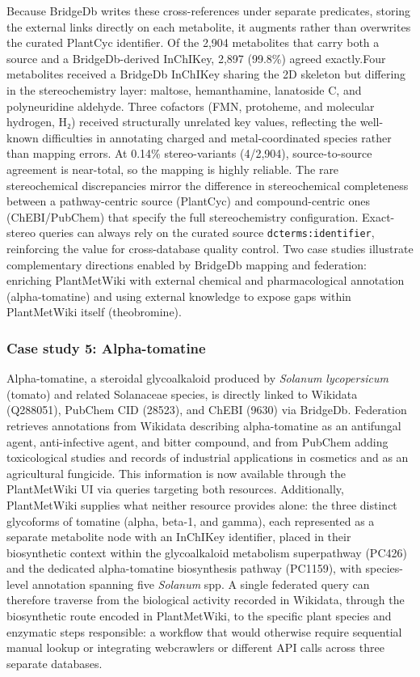 \documentclass[11pt,a4paper]{article}
\begin{document}
Because BridgeDb writes these cross-references under separate predicates, storing the external links
directly on each metabolite, it augments rather than overwrites the curated PlantCyc identifier. Of
the 2,904 metabolites that carry both a source and a BridgeDb-derived InChIKey, 2,897 (99.8\%) agreed
exactly.Four metabolites received a BridgeDb InChIKey sharing the 2D skeleton but differing in the
stereochemistry layer: maltose, hemanthamine, lanatoside C, and polyneuridine aldehyde. Three cofactors
(FMN, protoheme, and molecular hydrogen, H₂) received structurally unrelated key values, reflecting
the well-known difficulties in annotating charged and metal-coordinated species rather than mapping
errors. At 0.14\% stereo-variants (4/2,904), source-to-source agreement is near-total, so the mapping
is highly reliable. The rare stereochemical discrepancies mirror the difference in stereochemical
completeness between a pathway-centric source (PlantCyc) and compound-centric ones
(ChEBI/PubChem) that specify the full stereochemistry configuration. Exact-stereo queries can
always rely on the curated source \texttt{dcterms:identifier}, reinforcing the value for
cross-database quality control. Two case studies illustrate complementary directions enabled by BridgeDb mapping and federation:
enriching PlantMetWiki with external chemical and pharmacological annotation (alpha-tomatine) and
using external knowledge to expose gaps within PlantMetWiki itself (theobromine). 

\subsubsection*{Case study 5: Alpha-tomatine}
\vspace*{-1em}
Alpha-tomatine, a
steroidal glycoalkaloid produced by \textit{Solanum lycopersicum} (tomato) and related Solanaceae
species, is directly linked to Wikidata (Q288051), PubChem CID (28523), and ChEBI (9630) via BridgeDb.
Federation retrieves annotations from Wikidata describing alpha-tomatine as an antifungal agent,
anti-infective agent, and bitter compound, and from PubChem adding toxicological studies and records of
industrial applications in cosmetics and as an agricultural fungicide. This information is now
available through the PlantMetWiki UI via queries targeting both resources. Additionally,
PlantMetWiki supplies what neither resource provides alone: the three distinct glycoforms of tomatine
(alpha, beta-1, and gamma), each represented as a separate metabolite node with an InChIKey
identifier, placed in their biosynthetic context within the glycoalkaloid metabolism superpathway
(PC426) and the dedicated alpha-tomatine biosynthesis pathway (PC1159), with species-level annotation
spanning five \textit{Solanum} spp. A single federated query can therefore traverse from the
biological activity recorded in Wikidata, through the biosynthetic route encoded in PlantMetWiki, to
the specific plant species and enzymatic steps responsible: a workflow that would otherwise require
sequential manual lookup or integrating webcrawlers or different API calls across three separate databases.
\end{document}
